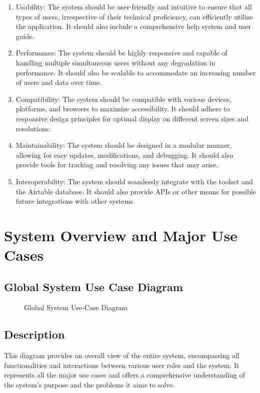 \begin{enumerate}
    \item Usability: The system should be user-friendly and intuitive to ensure that all types of users, irrespective of their technical proficiency, can efficiently utilize the application. It should also include a comprehensive help system and user guide.
    \item Performance: The system should be highly responsive and capable of handling multiple simultaneous users without any degradation in performance. It should also be scalable to accommodate an increasing number of users and data over time.
    \item Compatibility: The system should be compatible with various devices, platforms, and browsers to maximize accessibility. It should adhere to responsive design principles for optimal display on different screen sizes and resolutions.
    \item Maintainability: The system should be designed in a modular manner, allowing for easy updates, modifications, and debugging. It should also provide tools for tracking and resolving any issues that may arise.
    \item Interoperability: The system should seamlessly integrate with the  toolset and the Airtable database. It should also provide APIs or other means for possible future integrations with other systems.
\end{enumerate}



\section{System Overview and Major Use Cases}

\subsection{Global System Use Case Diagram}
\begin{figure}[H]
    \centering
    \caption{ Global System Use-Case Diagram }
    \label{fig:Global_System_UseCase_Diagram}
\end{figure}

\subsection*{Description}
This diagram provides an overall view of the entire system, encompassing all functionalities and interactions between various user roles and the system. It represents all the major use cases and offers a comprehensive understanding of the system's purpose and the problems it aims to solve.

